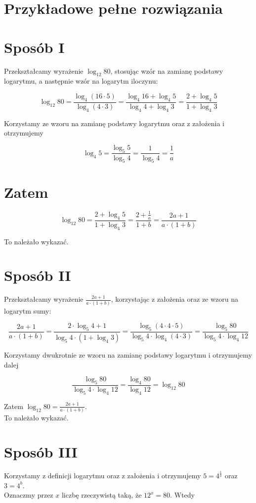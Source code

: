 \documentclass[10pt]{article}
\begin{document}
\section*{Przykładowe pełne rozwiązania}
\section*{Sposób I}
Przekształcamy wyrażenie $\log _{12} 80$, stosując wzór na zamianę podstawy logarytmu, a następnie wzór na logarytm iloczynu:

$$
\log _{12} 80=\frac{\log _{4}(16 \cdot 5)}{\log _{4}(4 \cdot 3)}=\frac{\log _{4} 16+\log _{4} 5}{\log _{4} 4+\log _{4} 3}=\frac{2+\log _{4} 5}{1+\log _{4} 3}
$$

Korzystamy ze wzoru na zamianę podstawy logarytmu oraz z założenia i otrzymujemy

$$
\log _{4} 5=\frac{\log _{5} 5}{\log _{5} 4}=\frac{1}{\log _{5} 4}=\frac{1}{a}
$$

\section*{Zatem}
$$
\log _{12} 80=\frac{2+\log _{4} 5}{1+\log _{4} 3}=\frac{2+\frac{1}{a}}{1+b}=\frac{2 a+1}{a \cdot(1+b)}
$$

To należało wykazać.

\section*{Sposób II}
Przekształcamy wyrażenie $\frac{2 a+1}{a \cdot(1+b)}$, korzystając z założenia oraz ze wzoru na logarytm sumy:

$$
\frac{2 a+1}{a \cdot(1+b)}=\frac{2 \cdot \log _{5} 4+1}{\log _{5} 4 \cdot\left(1+\log _{4} 3\right)}=\frac{\log _{5}(4 \cdot 4 \cdot 5)}{\log _{5} 4 \cdot \log _{4}(4 \cdot 3)}=\frac{\log _{5} 80}{\log _{5} 4 \cdot \log _{4} 12}
$$

Korzystamy dwukrotnie ze wzoru na zamianę podstawy logarytmu i otrzymujemy dalej

$$
\frac{\log _{5} 80}{\log _{5} 4 \cdot \log _{4} 12}=\frac{\log _{4} 80}{\log _{4} 12}=\log _{12} 80
$$

Zatem $\log _{12} 80=\frac{2 a+1}{a \cdot(1+b)}$.\\
To należało wykazać.

\section*{Sposób III}
Korzystamy z definicji logarytmu oraz z założenia i otrzymujemy $5=4^{\frac{1}{a}}$ oraz $3=4^{b}$.\\
Oznaczmy przez $x$ liczbę rzeczywistą taką, że $12^{x}=80$. Wtedy
\end{document}
